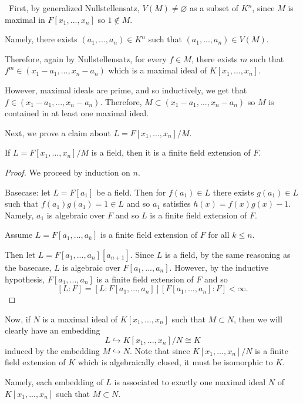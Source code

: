\documentclass[12pt]{AlgebraQual}
\begin{document}
\begin{solution}$\,$
First, by generalized Nullstellensatz, $V(M)\not=\varnothing$ as a subset of $K^n$, since $M$ is maximal in $F[x_1,...,x_n]$ so $1\notin M.$

Namely, there exists $(a_1,...,a_n)\in K^n$ such that $(a_1,...,a_n)\in V(M).$

Therefore, again by Nullstellensatz, for every $f\in M$, there exists $m$ such that $f^m\in(x_1-a_1,...,x_n-a_n)$ which is a maximal ideal of $K[x_1,...,x_n].$

However, maximal ideals are prime, and so inductively, we get that $f\in(x_1-a_1,...,x_n-a_n)$. Therefore, $M\subset (x_1-a_1,...,x_n-a_n)$ so $M$ is contained in at least one maximal ideal.


Next, we prove a claim about $L=F[x_1,...,x_n]/M$.

\begin{claim} If $L=F[x_1,...,x_n]/M$ is a field, then it is a finite field extension of $F$.
\begin{proof} We proceed by induction on $n.$

Basecase: let $L=F[a_1]$ be a field. Then for $f(a_1)\in L$ there exists $g(a_1)\in L$ such that $f(a_1)g(a_1)=1\in L$ and so $a_1$ satisfies $h(x)=f(x)g(x)-1$. Namely, $a_1$ is algebraic over $F$ and so $L$ is a finite field extension of $F.$

Assume $L=F[a_1,...,a_k]$ is a finite field extension of $F$ for all $k\le n$.

Then let $L=F[a_1,...,a_n][a_{n+1}]$. Since $L$ is a field, by the same reasoning as the basecase, $L$ is algebraic over $F[a_1,...,a_n]$. However, by the inductive hypothesis, $F[a_1,...,a_n]$ is a finite field extension of $F$ and so $$[L:F]=[L:F[a_1,...,a_n]][F[a_1,...,a_n]:F]<\infty.$$
\end{proof}
\end{claim}

Now, if $N$ is a maximal ideal of $K[x_1,...,x_n]$ such that $M\subset N$, then we will clearly have an embedding $$L\hookrightarrow K[x_1,...,x_n]/N\cong K$$ induced by the embedding $M\hookrightarrow N$. Note that since $K[x_1,...,x_n]/N$ is a finite field extension of $K$ which is algebraically closed, it must be isomorphic to $K.$

Namely, each embedding of $L$ is associated to exactly one maximal ideal $N$ of $K[x_1,...,x_n]$ such that $M\subset N$.


\end{solution}
\end{document}
